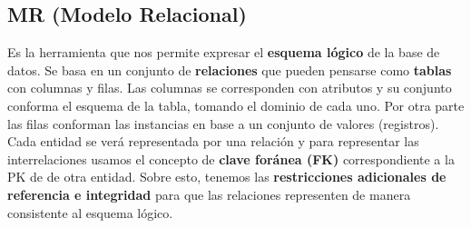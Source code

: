 \subsection*{MR (Modelo Relacional)}
Es la herramienta que nos permite expresar el \textbf{esquema lógico} de la base de datos. Se basa en un conjunto de \textbf{relaciones} que pueden pensarse como \textbf{tablas} con columnas y filas. Las columnas se corresponden con atributos y su conjunto conforma el esquema de la tabla, tomando el dominio de cada uno. Por otra parte las filas conforman las instancias en base a un conjunto de valores (registros). \\
Cada entidad se verá representada por una relación y para representar las interrelaciones usamos el concepto de \textbf{clave foránea (FK)} correspondiente a la PK de de otra entidad. Sobre esto, tenemos las \textbf{restricciones adicionales de referencia e integridad} para que las relaciones representen de manera consistente al esquema lógico.
